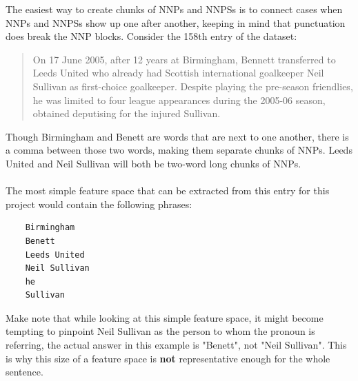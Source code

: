 \documentclass{article}
\begin{document}
The easiest way to create chunks of NNPs and NNPSs is to connect cases when NNPs and NNPSs show up one after another, keeping in mind that punctuation does break the NNP blocks.
Consider the 158th entry of the dataset:
\begin{quote}
    On 17 June 2005, after 12 years at Birmingham, Bennett transferred to Leeds United who already had Scottish international goalkeeper Neil Sullivan as first-choice goalkeeper. Despite playing the pre-season friendlies, he was limited to four league appearances during the 2005-06 season, obtained deputising for the injured Sullivan.
\end{quote}
Though Birmingham and Benett are words that are next to one another, there is a comma between those two words, making them separate chunks of NNPs. Leeds United and Neil Sullivan will both be two-word long chunks of NNPs. \\ \\
The most simple feature space that can be extracted from this entry for this project would contain the following phrases:
\begin{verbatim}
    Birmingham
    Benett
    Leeds United
    Neil Sullivan
    he
    Sullivan
\end{verbatim}
Make note that while looking at this simple feature space, it might become tempting to pinpoint Neil Sullivan as the person to whom the pronoun is referring, the actual answer in this example is "Benett", not "Neil Sullivan". This is why this size of a feature space is \textbf{not} representative enough for the whole sentence.\\ \\
\end{document}
